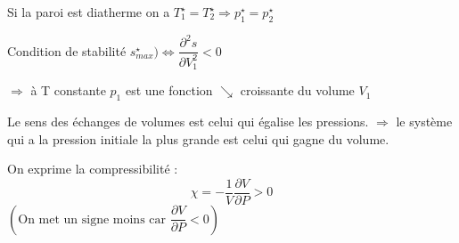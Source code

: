 \documentclass[12pt,a4paper]{report}
\begin{document}
Si la paroi est diatherme on a \(T_1^\star = T_2^\star \Rightarrow p^\star_1 = p^\star_2\)

Condition de stabilité \(s^\star_{max}) \Leftrightarrow \dfrac{\partial^2 s}{\partial V_1^2} < 0\)

\(\Rightarrow \) à T constante \(p_1\) est une fonction \(\searrow\) croissante du volume \(V_1\)


Le sens des échanges de volumes est celui qui égalise les pressions. \(\Rightarrow\) le système qui a la pression initiale la plus grande est celui qui gagne du volume.

On exprime la compressibilité :
\[
	\chi = - \dfrac{1}{V} \dfrac{\partial V}{\partial P} > 0
\]
\(\left( \text{On met un signe moins car } \dfrac{\partial V}{\partial P} < 0 \right)\)
\end{document}

